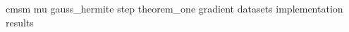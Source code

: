 \newpage
\appendix
{cmsm}
{mu}
{gauss_hermite}
{step}
{theorem_one}
{gradient}
{datasets}
{implementation}
{results}






